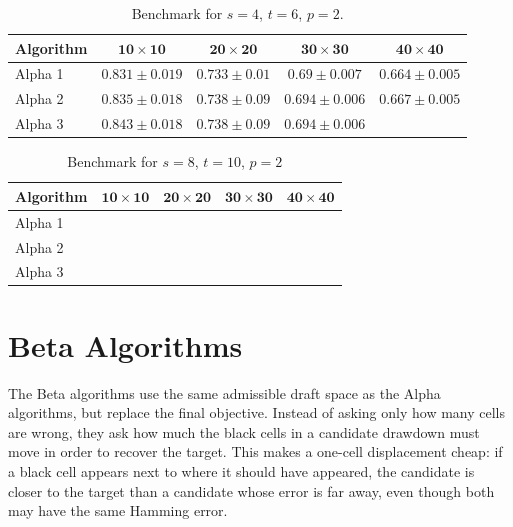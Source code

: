 \documentclass[11pt]{article}
\begin{document}
\begin{table}[ht]
  \centering
    \begin{tabular}{lcccc}
    \hline
    \textbf{Algorithm} & \(\boldsymbol{10\times10}\) & \(\boldsymbol{20\times20}\) & \(\boldsymbol{30\times30}\) & \(\boldsymbol{40\times40}\) \\
    \hline
    Alpha 1 & $0.831 \pm 0.019$ & $0.733\pm 0.01$ & $0.69\pm 0.007$ &  $0.664\pm 0.005$ \\
    Alpha 2 & $0.835\pm 0.018$ &  $0.738\pm 0.09$ & $0.694\pm 0.006$ & $0.667\pm0.005$\\
    Alpha 3 &  $0.843\pm 0.018$ & $0.738\pm 0.09$ & $0.694\pm 0.006$ & \\
    \hline
  \end{tabular}
  \caption{Benchmark for $s=4$, $t=6$, $p=2$.}
  \label{tab:benchmark-four-shaft}
\end{table}


\begin{table}[ht]
  \centering
  \begin{tabular}{lcccc}
    \hline
    \textbf{Algorithm} & \(\boldsymbol{10\times10}\) & \(\boldsymbol{20\times20}\) & \(\boldsymbol{30\times30}\) & \(\boldsymbol{40\times40}\) \\
    \hline
    Alpha 1 & & & & \\
    Alpha 2 & & & & \\
    Alpha 3 & & & & \\
    \hline
  \end{tabular}
    \caption{Benchmark for $s=8$, $t=10$, $p=2$}
    \label{tab:benchmark-eight-shaft}

\end{table}


\newpage 
\section{Beta Algorithms}

The Beta algorithms use the same admissible draft space as the Alpha
algorithms, but replace the final objective. Instead of asking only how many
cells are wrong, they ask how much the black cells in a candidate drawdown must
move in order to recover the target.  This makes a one-cell displacement cheap:
if a black cell appears next to where it should have appeared, the candidate is
closer to the target than a candidate whose error is far away, even though both
may have the same Hamming error.
\end{document}
